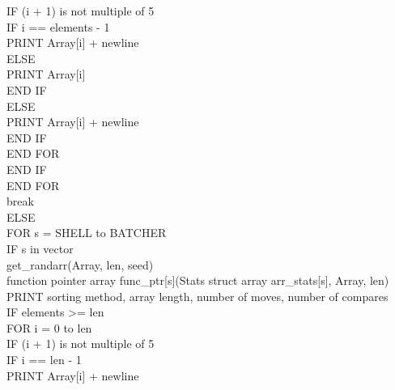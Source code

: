 \documentclass[12pt]{article}
\begin{document}
\indent \indent \indent \indent \indent \indent IF (i + 1) is not multiple of 5 \\
\indent \indent \indent \indent \indent \indent \indent IF i == elements - 1 \\
\indent \indent \indent \indent \indent \indent \indent \indent PRINT Array[i] + newline \\
\indent \indent \indent \indent \indent \indent \indent ELSE \\
\indent \indent \indent \indent \indent \indent \indent \indent PRINT Array[i] \\
\indent \indent \indent \indent \indent \indent \indent END IF \\
\indent \indent \indent \indent \indent \indent ELSE \\
\indent \indent \indent \indent \indent \indent \indent PRINT Array[i] + newline \\
\indent \indent \indent \indent \indent \indent END IF \\
\indent \indent \indent \indent \indent END FOR \\
\indent \indent \indent \indent END IF \\
\indent \indent \indent END FOR \\
\indent \indent \indent break \\
\indent \indent ELSE \\
\indent \indent \indent FOR s = SHELL to BATCHER \\
\indent \indent \indent \indent IF s in vector \\
\indent \indent \indent \indent \indent get\_randarr(Array, len, seed) \\
\indent \indent \indent \indent \indent function pointer array func\_ptr[s](Stats struct array arr\_stats[s], Array, len) \\
\indent \indent \indent \indent \indent PRINT sorting method, array length, number of moves, number of compares \\
\indent \indent \indent \indent \indent IF elements >= len \\
\indent \indent \indent \indent \indent \indent FOR i = 0 to len \\
\indent \indent \indent \indent \indent \indent \indent IF (i + 1) is not multiple of 5 \\
\indent \indent \indent \indent \indent \indent \indent \indent IF i == len - 1 \\
\indent \indent \indent \indent \indent \indent \indent \indent \indent PRINT Array[i] + newline \\
\end{document}
